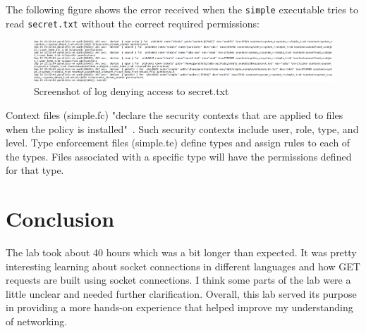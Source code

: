 \documentclass[11pt]{article}
\begin{document}
The following figure shows the error received when the \verb|simple| executable tries to read \verb|secret.txt| without the correct required permissions:
\begin{figure}[htbp]
  \centering
  \includegraphics[width=.9\linewidth]{./log.png}
  \caption{\label{fig:log}
  Screenshot of log denying access to secret.txt}
\end{figure}

Context files (simple.fc) "declare the security contexts that are applied to files when the policy is installed"~\cite{context}.
Such security contexts include user, role, type, and level.
Type enforcement files (simple.te) define types and assign rules to each of the types.
Files associated with a specific type will have the permissions defined for that type.

\section*{Conclusion}
\label{sec:conclusion}
The lab took about 40 hours which was a bit longer than expected.
It was pretty interesting learning about socket connections in different languages and how GET requests are built using socket connections.
I think some parts of the lab were a little unclear and needed further clarification.
Overall, this lab served its purpose in providing a more hands-on experience that helped improve my understanding of networking.

\nocite{*}


\end{document}
